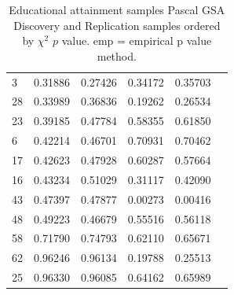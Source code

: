 \begin{table}[ht]
\begin{tabular}{llllll}
  3 & 0.31886 & 0.27426 & 0.34172 & 0.35703 \\ 
  28 & 0.33989 & 0.36836 & 0.19262 & 0.26534 \\ 
  23 & 0.39185 & 0.47784 & 0.58355 & 0.61850 \\ 
  6 & 0.42214 & 0.46701 & 0.70931 & 0.70462 \\ 
  17 & 0.42623 & 0.47928 & 0.60287 & 0.57664 \\ 
  16 & 0.43234 & 0.51029 & 0.31117 & 0.42090 \\ 
  43 & 0.47397 & 0.47877 & 0.00273 & 0.00416 \\ 
  48 & 0.49223 & 0.46679 & 0.55516 & 0.56118 \\ 
  58 & 0.71790 & 0.74793 & 0.62110 & 0.65671 \\ 
  62 & 0.96246 & 0.96134 & 0.19788 & 0.25513 \\ 
  25 & 0.96330 & 0.96085 & 0.64162 & 0.65989 \\ 
   \bottomrule
\end{tabular}
\caption[GSA Pascal Educational attainment sample]{Educational attainment samples Pascal GSA Discovery and Replication samples ordered by $\chi^2$ $p$ value. emp = empirical p value method.} 
\label{tab:Pascal Education ordered by chi2P}
\end{table}
\clearpage




